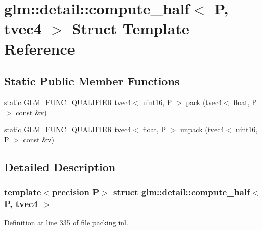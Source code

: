 \hypertarget{structglm_1_1detail_1_1compute__half_3_01_p_00_01tvec4_01_4}{}\section{glm\+::detail\+::compute\+\_\+half$<$ P, tvec4 $>$ Struct Template Reference}
\label{structglm_1_1detail_1_1compute__half_3_01_p_00_01tvec4_01_4}
\subsection*{Static Public Member Functions}
\begin{DoxyCompactItemize}
\item 
static \mbox{\hyperlink{setup_8hpp_a33fdea6f91c5f834105f7415e2a64407}{G\+L\+M\+\_\+\+F\+U\+N\+C\+\_\+\+Q\+U\+A\+L\+I\+F\+I\+ER}} \mbox{\hyperlink{structglm_1_1tvec4}{tvec4}}$<$ \mbox{\hyperlink{namespaceglm_1_1detail_a47b2a7d006d187338e8031a352d1ce56}{uint16}}, P $>$ \mbox{\hyperlink{structglm_1_1detail_1_1compute__half_3_01_p_00_01tvec4_01_4_a10c39dc8342760eee962fb57e5d8a391}{pack}} (\mbox{\hyperlink{structglm_1_1tvec4}{tvec4}}$<$ float, P $>$ const \&\mbox{\hyperlink{glad_8h_a14cfbe2fc2234f5504618905b69d1e06}{v}})
\item 
static \mbox{\hyperlink{setup_8hpp_a33fdea6f91c5f834105f7415e2a64407}{G\+L\+M\+\_\+\+F\+U\+N\+C\+\_\+\+Q\+U\+A\+L\+I\+F\+I\+ER}} \mbox{\hyperlink{structglm_1_1tvec4}{tvec4}}$<$ float, P $>$ \mbox{\hyperlink{structglm_1_1detail_1_1compute__half_3_01_p_00_01tvec4_01_4_a60cf0de8f240ff4836f7f96799cf5494}{unpack}} (\mbox{\hyperlink{structglm_1_1tvec4}{tvec4}}$<$ \mbox{\hyperlink{namespaceglm_1_1detail_a47b2a7d006d187338e8031a352d1ce56}{uint16}}, P $>$ const \&\mbox{\hyperlink{glad_8h_a14cfbe2fc2234f5504618905b69d1e06}{v}})
\end{DoxyCompactItemize}


\subsection{Detailed Description}
\subsubsection*{template$<$precision P$>$\newline
struct glm\+::detail\+::compute\+\_\+half$<$ P, tvec4 $>$}



Definition at line 335 of file packing.\+inl.



